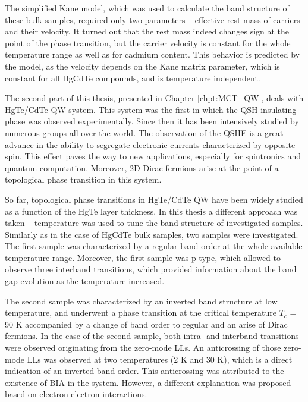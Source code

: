 \documentclass[titlepage,a4paper]{book}
\begin{document}
The simplified Kane model, which was used to calculate the band structure of these bulk samples, required only two parameters -- effective rest mass of carriers and their velocity. It turned out that the rest mass indeed changes sign at the point of the phase transition, but the carrier velocity is constant for the whole temperature range as well as for cadmium content. This behavior is predicted by the model, as the velocity depends on the Kane matrix parameter, which is constant for all HgCdTe compounds, and is temperature independent. 

\vspace{5mm}

The second part of this thesis, presented in Chapter \ref{chpt:MCT_QW}, deals with HgTe/CdTe QW system. This system was the first in which the QSH insulating phase was observed experimentally. Since then it has been intensively studied by numerous groups all over the world. The observation of the QSHE is a great advance in the ability to segregate electronic currents characterized by opposite spin. This effect paves the way to new applications, especially for spintronics and quantum computation. Moreover, 2D Dirac fermions arise at the point of a topological phase transition in this system. 

So far, topological phase transitions in HgTe/CdTe QW have been widely studied as a function of the HgTe layer thickness. In this thesis a different approach was taken -- temperature was used to tune the band structure of investigated samples. Similarly as in the case of HgCdTe bulk samples, two samples were investigated. The first sample was characterized by a regular band order at the whole available temperature range. Moreover, the first sample was p-type, which allowed to observe three interband transitions, which provided information about the band gap evolution as the temperature increased. 

The second sample was characterized by an inverted band structure at low temperature, and underwent a phase transition at the critical temperature $T_c$ = 90 K accompanied by a change of band order to regular and an arise of Dirac fermions. In the case of the second sample, both intra- and interband transitions were observed originating from the zero-mode LLs. An anticrossing of those zero-mode LLs was observed at two temperatures (2 K and 30 K), which is a direct indication of an inverted band order. This anticrossing was attributed to the existence of BIA in the system. However, a different explanation was proposed based on electron-electron interactions.
\end{document}
